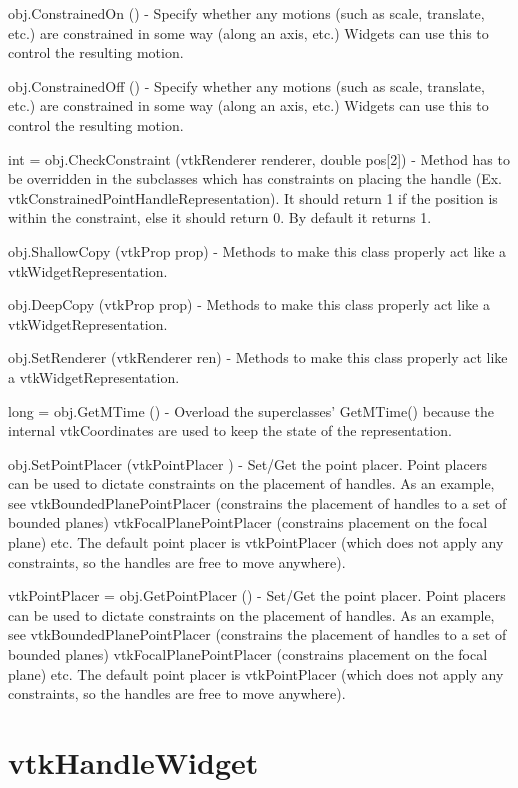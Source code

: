 \begin{DoxyItemize}
\item {\ttfamily obj.\-Constrained\-On ()} -\/ Specify whether any motions (such as scale, translate, etc.) are constrained in some way (along an axis, etc.) Widgets can use this to control the resulting motion.  
\item {\ttfamily obj.\-Constrained\-Off ()} -\/ Specify whether any motions (such as scale, translate, etc.) are constrained in some way (along an axis, etc.) Widgets can use this to control the resulting motion.  
\item {\ttfamily int = obj.\-Check\-Constraint (vtk\-Renderer renderer, double pos\mbox{[}2\mbox{]})} -\/ Method has to be overridden in the subclasses which has constraints on placing the handle (Ex. vtk\-Constrained\-Point\-Handle\-Representation). It should return 1 if the position is within the constraint, else it should return 0. By default it returns 1.  
\item {\ttfamily obj.\-Shallow\-Copy (vtk\-Prop prop)} -\/ Methods to make this class properly act like a vtk\-Widget\-Representation.  
\item {\ttfamily obj.\-Deep\-Copy (vtk\-Prop prop)} -\/ Methods to make this class properly act like a vtk\-Widget\-Representation.  
\item {\ttfamily obj.\-Set\-Renderer (vtk\-Renderer ren)} -\/ Methods to make this class properly act like a vtk\-Widget\-Representation.  
\item {\ttfamily long = obj.\-Get\-M\-Time ()} -\/ Overload the superclasses' Get\-M\-Time() because the internal vtk\-Coordinates are used to keep the state of the representation.  
\item {\ttfamily obj.\-Set\-Point\-Placer (vtk\-Point\-Placer )} -\/ Set/\-Get the point placer. Point placers can be used to dictate constraints on the placement of handles. As an example, see vtk\-Bounded\-Plane\-Point\-Placer (constrains the placement of handles to a set of bounded planes) vtk\-Focal\-Plane\-Point\-Placer (constrains placement on the focal plane) etc. The default point placer is vtk\-Point\-Placer (which does not apply any constraints, so the handles are free to move anywhere).  
\item {\ttfamily vtk\-Point\-Placer = obj.\-Get\-Point\-Placer ()} -\/ Set/\-Get the point placer. Point placers can be used to dictate constraints on the placement of handles. As an example, see vtk\-Bounded\-Plane\-Point\-Placer (constrains the placement of handles to a set of bounded planes) vtk\-Focal\-Plane\-Point\-Placer (constrains placement on the focal plane) etc. The default point placer is vtk\-Point\-Placer (which does not apply any constraints, so the handles are free to move anywhere).  
\end{DoxyItemize}\hypertarget{vtkwidgets_vtkhandlewidget}{}\section{vtk\-Handle\-Widget}\label{vtkwidgets_vtkhandlewidget}
